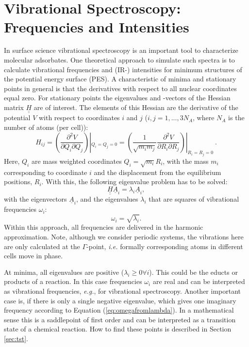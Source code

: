\documentclass[11pt,DIV=13,BCOR=5mm,a4paper,headinclude]{scrbook}
\renewcommand{\vec}[1]{\underline{#1}}
\def\doubleunderline#1{\underline{\underline{#1}}}
\begin{document}
\section{Vibrational Spectroscopy: Frequencies and Intensities}\label{sec:freq_theo}
In surface science vibrational spectroscopy is an important tool to characterize molecular adsorbates.
One theoretical approach to simulate such spectra is to calculate vibrational frequencies and (IR-) intensities for minimum structures of the potential energy surface (PES).
A characteristic of minima and stationary points in general is that the derivatives with respect to all nuclear coordinates equal zero.
For stationary points the eigenvalues and -vectors of the Hessian matrix $\doubleunderline{H}$ are of interest.
The elements of this Hessian are the derivative of the potential $V$ with respect to coordinates $i$ and $j$ ($i,j=1,...,3N_A$, where $N_A$ is the number of atoms (per cell)):
\begin{equation}\label{eq:hesse}
 H_{ij}=\left( \frac{\partial^2 V}{\partial Q_i \partial Q_j} \right)|_{Q_i=Q_j=0}=\left(\frac{1}{\sqrt{m_i m_j}} \frac{\partial^2 V}{\partial R_i \partial R_j} \right)|_{R_i=R_j=0} ~.
\end{equation}
Here, $Q_i$ are mass weighted coordinates $Q_i=\sqrt{m_i}R_i$, with the mass $m_i$ corresponding to coordinate $i$ and the displacement from the equilibrium positions, $R_i$.
With this, the following eigenvalue problem has to be solved:
\begin{equation}
 \doubleunderline{H} \vec{A}_i=\lambda_i\vec{A}_i,
\end{equation}
with the eigenvectors $\vec{A}_i$, and the eigenvalues $\lambda_i$ that are squares of vibrational frequencies $\omega_i$: 
\begin{equation}\label{eq:omegafromlambda}
 \omega_i=\sqrt{\lambda_i}.
\end{equation}
Within this approach, all frequencies are delivered in the harmonic approximation.
Note, although we consider periodic systems, the vibrations here are only calculated at the $\Gamma$-point, \textit{i.e.} formally corresponding atoms in different cells move in phase.


At minima, all eigenvalues are positive ($\lambda_i\geq 0 \forall i$).
This could be the educts or products of a reaction.
In this case frequencies $\omega_i$ are real and can be interpreted as vibrational frequencies, \textit{e.g.}, for vibrational spectroscopy.
Another important case is, if there is only a single negative eigenvalue, which gives one imaginary frequency according to Equation (\ref{eq:omegafromlambda}).
In a mathematical sense this is a saddlepoint of first order and can be interpreted as a transition state of a chemical reaction.
How to find these points is described in Section \ref{sec:tst}.
\\\\
\end{document}
